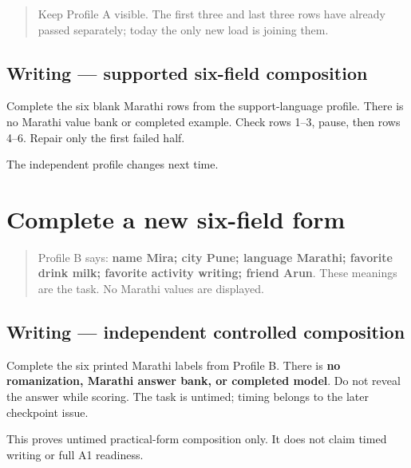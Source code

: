 \label{lesson:MR-A1F12-six-field-supported}



\begin{quote}
Keep Profile A visible. The first three and last three rows have already passed separately; today the only new load is joining them.
\end{quote}

\subsection*{Writing — supported six-field composition}
Complete the six blank Marathi rows from the support-language profile. There is no Marathi value bank or completed example. Check rows 1–3, pause, then rows 4–6. Repair only the first failed half.

\begin{tcolorbox}[breakable,colback=teal!4,colframe=teal!35!black,title={Before you move on}]
The independent profile changes next time.
\end{tcolorbox}
\section[independent six-field Marathi profile]{Complete a new six-field form}

\label{lesson:MR-A1F13-six-field-independent}



\begin{quote}
Profile B says: \textbf{name Mira; city Pune; language Marathi; favorite drink milk; favorite activity writing; friend Arun}. These meanings are the task. No Marathi values are displayed.
\end{quote}

\subsection*{Writing — independent controlled composition}
Complete the six printed Marathi labels from Profile B. There is \textbf{no romanization, Marathi answer bank, or completed model}. Do not reveal the answer while scoring. The task is untimed; timing belongs to the later checkpoint issue.

\begin{tcolorbox}[breakable,colback=teal!4,colframe=teal!35!black,title={Before you move on}]
This proves untimed practical-form composition only. It does not claim timed writing or full A1 readiness.
\end{tcolorbox}

